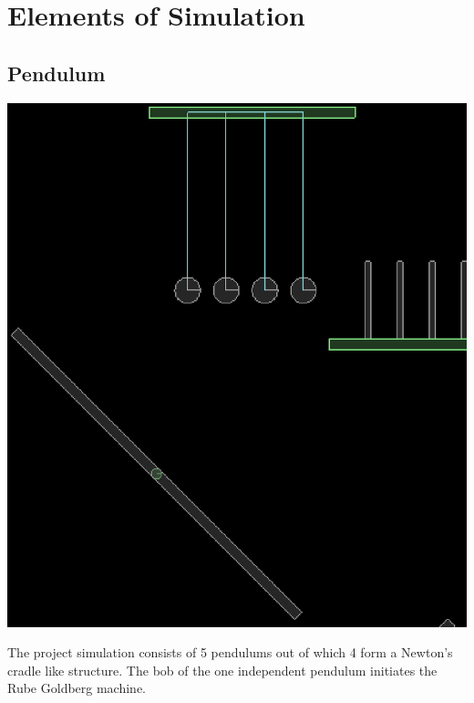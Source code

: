 \documentclass[11pt]{article}
\begin{document}
\section{Elements of Simulation}
\subsection{Pendulum}
\begin{center}
\includegraphics[scale=0.5]{pendulum}
\end{center}
The project simulation consists of 5 pendulums out of which 4 form a Newton's cradle like structure. The bob of the one independent pendulum initiates the Rube Goldberg machine.
\end{document}
